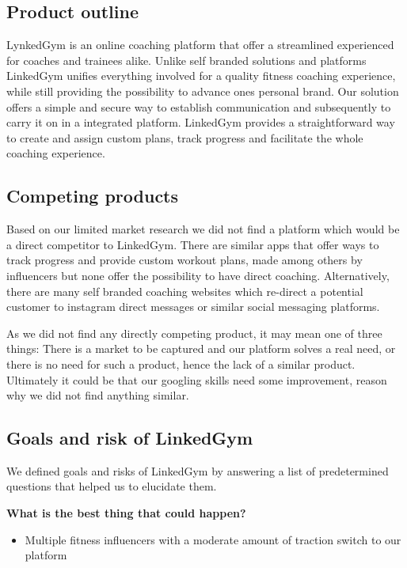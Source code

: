 \subsection{Product outline}

LynkedGym is an online coaching platform that offer a streamlined experienced for coaches and trainees alike. Unlike self branded solutions and platforms LinkedGym unifies everything involved for a quality fitness coaching experience, while still providing the possibility to advance ones personal brand. Our solution offers a simple and secure way to establish communication and subsequently to carry it on in a integrated platform. LinkedGym provides a straightforward way to create and assign custom plans, track progress and facilitate the whole coaching experience.

\subsection{Competing products}

Based on our limited market research we did not find a platform which would be a direct competitor to LinkedGym. There are similar apps that offer ways to track progress and provide custom workout plans, made among others by influencers but none offer the possibility to have direct coaching. Alternatively, there are many self branded coaching websites which re-direct a potential customer to instagram direct messages or similar social messaging platforms.

As we did not find any directly competing product, it may mean one of three things: There is a market to be captured and our platform solves a real need, or there is no need for such a product, hence the lack of a similar product. Ultimately it could be that our googling skills need some improvement, reason why we did not find anything similar.

\subsection{Goals and risk of LinkedGym}

We defined goals and risks of LinkedGym by answering a list of predetermined questions that helped us to elucidate them.

\textbf{What is the best thing that could happen?}

\begin{itemize}
  \item Multiple fitness influencers with a moderate amount of traction switch to our platform
\end{itemize}

